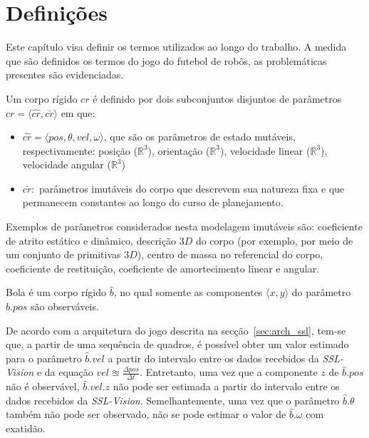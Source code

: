 \section{Definições}\label{sec:defs}

Este capítulo visa definir os termos utilizados ao longo do
trabalho. A medida que são definidos os termos do jogo do
futebol de robôs, as problemáticas presentes são evidenciadas.

\begin{defi}
  Um corpo rígido $cr$ é definido por dois subconjuntos disjuntos
  de parâmetros $cr= \langle \hat{cr}, \bar{cr} \rangle$ em que:
  \begin{itemize}
    \item $\hat{cr} = \langle pos, \theta, vel, \omega \rangle$,
    que são os parâmetros de estado mutáveis, respectivamente:
    posição ($\mathbb{R} ^{3}$), orientação ($\mathbb{R} ^{3}$),
    velocidade linear ($\mathbb{R} ^{3}$), velocidade angular
    ($\mathbb{R} ^{3}$)

    \item $\bar{cr} :$ parâmetros imutáveis do corpo que descrevem sua
    natureza fixa e que permanecem constantes ao longo do curso de 
    planejamento.
  \end{itemize}
\end{defi}

  Exemplos de parâmetros considerados nesta modelagem imutáveis são:
  coeficiente de atrito estático e dinâmico, descrição $3D$ do corpo
  (por exemplo, por meio de um conjunto de primitivas $3D$), centro de
  massa no referencial do corpo, coeficiente de restituição,
  coeficiente de amortecimento linear e angular.

\begin{defi}[Bola]\label{def:bola}
  Bola é um corpo rígido $\hat{b}$, no qual somente as componentes
  $\langle x,y \rangle$ do parâmetro $\hat{b}.pos$ são
  observáveis.
\end{defi}

  De acordo com a arquitetura do jogo descrita na secção~\ref{sec:arch_ssl},
  tem-se que, a partir de uma sequência
  de quadros, é possível obter um valor estimado para o parâmetro
  $\hat{b}.vel$ a partir do intervalo entre os dados recebidos
  da \textit{SSL-Vision} e da equação $ vel \approxeq 
  \frac{\Delta pos}{\Delta t} $. Entretanto, uma vez que a componente
  $z$ de $\hat{b}.pos$ não é observável, $\hat{b}.vel.z$ 
  não pode ser estimada a partir do intervalo entre os dados recebidos
  da \textit{SSL-Vision}. Semelhantemente,  uma vez que o
  parâmetro $\hat{b}.\theta$ também não pode ser observado,
  não se pode estimar o valor de $\hat{b}.\omega$ com exatidão.

